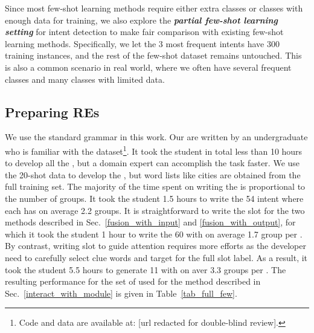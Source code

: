 Since most few-shot learning methods require either extra classes or classes with enough data for training, we also explore the
\textbf{\emph{partial few-shot learning setting}} for intent detection to make fair comparison with existing few-shot learning methods.
Specifically, we let the 3 most frequent intents have 300 training instances, and the rest of the few-shot dataset remains untouched.
This is also a common scenario in real world, where we often have several frequent classes and many classes with limited data.

\subsection{Preparing REs}
\label{re_in_exp} We use the standard \RE grammar in this work. Our \REs are written by an undergraduate who is familiar with the
dataset\footnote{Code and data are available at: [url redacted for double-blind review].}.  It took the student in total less than 10 hours
to develop all the \REs, but a domain expert can accomplish the task faster. We use the 20-shot data to develop the \REs, but word lists
like cities are obtained from the full training set. The majority of the time spent on writing the \REs is proportional to the number of
\RE groups. It took the student 1.5 hours to write the 54 intent \REs where each \RE has on average 2.2 \RE groups. It is straightforward
to write the slot \REs for the two methods described in Sec.~\ref{fusion_with_input} and \ref{fusion_with_output}, for which it took the
student 1 hour to write the 60 \REs with on average 1.7 group per \RE. By contrast, writing slot \REs to guide attention requires more
efforts as the developer need to carefully select clue words and target for the full slot label. As a result, it took the student 5.5 hours
to generate 11 \REs with on aver 3.3 \RE groups per \RE. The resulting performance for the set of \REs used for the method described in
Sec.~\ref{interact_with_module} is given in Table~\ref{tab_full_few}.


